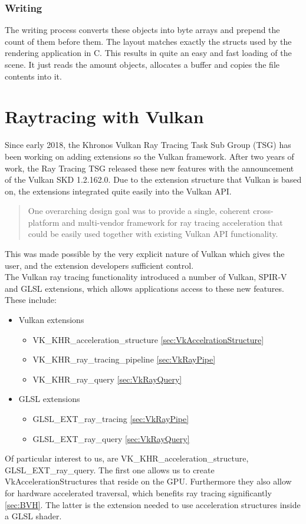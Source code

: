 \subsection{Writing}
The writing process converts these objects into byte arrays and prepend the count of them before them. The layout matches exactly the structs used by the rendering application in C. This results in quite an easy and fast loading of the scene. It just reads the amount objects, allocates a buffer and copies the file contents into it.
\chapter{Raytracing with Vulkan}
\label{sec:VkRayTracing}
Since early 2018, the Khronos Vulkan Ray Tracing Task Sub Group (TSG) has been working on adding extensions so the Vulkan framework. After two years of work, the Ray Tracing TSG released these new features with the announcement of the Vulkan SKD 1.2.162.0. Due to the extension structure that Vulkan is based on, the extensions integrated quite easily into the Vulkan API.
\begin{quote}
    One overarching design goal was to provide a single, coherent cross-platform and multi-vendor framework for ray tracing acceleration that could be easily used together with existing Vulkan API functionality.
\end{quote}
This was made possible by the very explicit nature of Vulkan which gives the user, and the extension developers sufficient control.\\
The Vulkan ray tracing functionality introduced a number of Vulkan, SPIR-V and GLSL extensions, which allows applications access to these new features. These include:
\begin{itemize}
    \item Vulkan extensions
    \begin{itemize}
        \item VK\_KHR\_acceleration\_structure \ref{sec:VkAccelrationStructure}
        \item VK\_KHR\_ray\_tracing\_pipeline \ref{sec:VkRayPipe}
        \item VK\_KHR\_ray\_query \ref{sec:VkRayQuery}
    \end{itemize}
    \item GLSL extensions
    \begin{itemize}
        \item GLSL\_EXT\_ray\_tracing \ref{sec:VkRayPipe}
        \item GLSL\_EXT\_ray\_query \ref{sec:VkRayQuery}
    \end{itemize}
\end{itemize}
Of particular interest to us, are VK\_KHR\_acceleration\_structure, GLSL\_EXT\_ray\_query. The first one allows us to create VkAccelerationStructures that reside on the GPU. Furthermore they also allow for hardware accelerated traversal, which benefits ray tracing significantly \ref{sec:BVH}. The latter is the extension needed to use acceleration structures inside a GLSL shader. \cite{vulkanRayTracing}
\newpage
